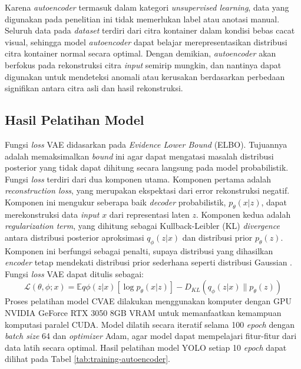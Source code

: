 Karena \textit{autoencoder} termasuk dalam kategori \textit{unsupervised
learning}, data yang digunakan pada penelitian ini tidak memerlukan
label atau anotasi manual. Seluruh data pada \textit{dataset} terdiri
dari citra kontainer dalam kondisi bebas cacat visual, sehingga model
\textit{autoencoder} dapat belajar merepresentasikan
distribusi citra kontainer normal secara optimal. Dengan demikian,
\textit{autoencoder} akan berfokus pada rekonstruksi citra
\textit{input} semirip
mungkin, dan nantinya dapat digunakan untuk mendeteksi anomali atau
kerusakan berdasarkan perbedaan signifikan antara citra asli dan
hasil rekonstruksi.

\vspace{1em}

\subsection{Hasil Pelatihan Model}

Fungsi \textit{loss} VAE didasarkan pada \textit{Evidence Lower
Bound} (ELBO). Tujuannya
adalah memaksimalkan \textit{bound} ini agar dapat mengatasi masalah
distribusi posterior yang tidak dapat dihitung secara langsung pada
model probabilistik. Fungsi \textit{loss} terdiri dari dua komponen utama.
Komponen pertama adalah \textit{reconstruction loss}, yang merupakan
ekspektasi dari error rekonstruksi negatif. Komponen ini mengukur
seberapa baik \textit{decoder} probabilistik, $p_\theta(x|z)$, dapat
merekonstruksi data \textit{input} $x$ dari representasi laten $z$. Komponen
kedua adalah \textit{regularization term}, yang dihitung sebagai
Kullback-Leibler (KL) \textit{divergence} antara distribusi posterior
aproksimasi $q_\phi(z|x)$ dan distribusi prior $p_\theta(z)$.
Komponen ini berfungsi sebagai penalti, supaya distribusi yang
dihasilkan \textit{encoder} tetap mendekati distribusi prior sederhana
seperti distribusi Gaussian \citep{26}. Fungsi \textit{loss}
VAE dapat ditulis sebagai:
\begin{equation}
  \mathcal{L}(\theta, \phi; x) = \mathbb{E}{q\phi(z|x)}[\log
  p_\theta(x|z)] - D_{KL}(q_\phi(z|x) \parallel p_\theta(z))
\end{equation}
\indent
Proses pelatihan model CVAE dilakukan
menggunakan komputer dengan GPU NVIDIA GeForce RTX 3050 8GB VRAM
untuk memanfaatkan kemampuan komputasi paralel CUDA. Model dilatih
secara iteratif selama 100 \textit{epoch} dengan
\textit{batch size} 64
dan \textit{optimizer} Adam, agar model dapat mempelajari fitur-fitur
dari data latih secara optimal. Hasil pelatihan model YOLO setiap 10
\textit{epoch} dapat dilihat pada Tabel \ref{tab:training-autoencoder}.

